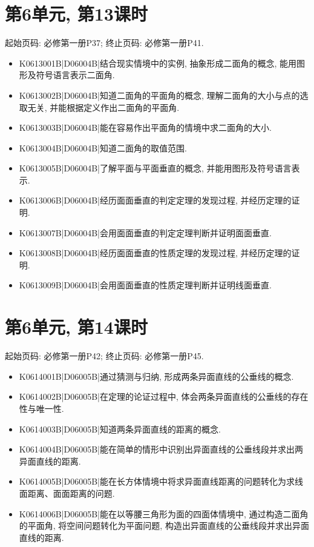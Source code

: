 \section*{第6单元, 第13课时}
起始页码: 必修第一册P37; 终止页码: 必修第一册P41.
\begin{itemize}
\item K0613001B|D06004B|结合现实情境中的实例, 抽象形成二面角的概念, 能用图形及符号语言表示二面角.
\item K0613002B|D06004B|知道二面角的平面角的概念, 理解二面角的大小与点的选取无关, 并能根据定义作出二面角的平面角.
\item K0613003B|D06004B|能在容易作出平面角的情境中求二面角的大小.
\item K0613004B|D06004B|知道二面角的取值范围.
\item K0613005B|D06004B|了解平面与平面垂直的概念, 并能用图形及符号语言表示.
\item K0613006B|D06004B|经历面面垂直的判定定理的发现过程, 并经历定理的证明.
\item K0613007B|D06004B|会用面面垂直的判定定理判断并证明面面垂直.
\item K0613008B|D06004B|经历面面垂直的性质定理的发现过程, 并经历定理的证明.
\item K0613009B|D06004B|会用面面垂直的性质定理判断并证明线面垂直.
\end{itemize}

\section*{第6单元, 第14课时}
起始页码: 必修第一册P42; 终止页码: 必修第一册P45.
\begin{itemize}
\item K0614001B|D06005B|通过猜测与归纳, 形成两条异面直线的公垂线的概念.
\item K0614002B|D06005B|在定理的论证过程中, 体会两条异面直线的公垂线的存在性与唯一性.
\item K0614003B|D06005B|知道两条异面直线的距离的概念.
\item K0614004B|D06005B|能在简单的情形中识别出异面直线的公垂线段并求出两异面直线的距离.
\item K0614005B|D06005B|能在长方体情境中将求异面直线距离的问题转化为求线面距离、面面距离的问题.
\item K0614006B|D06005B|能在以等腰三角形为面的四面体情境中, 通过构造二面角的平面角, 将空间问题转化为平面问题, 构造出异面直线的公垂线段并求出异面直线的距离.
\end{itemize}


